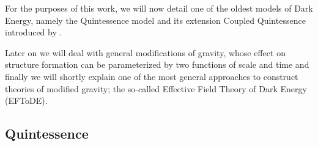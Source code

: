 For the purposes of this work, we will now detail one of the oldest models of Dark Energy, namely
the Quintessence model \cite{Ratra-Peebles; Christof} and its extension
Coupled Quintessence introduced by \cite{Amendola_2000}.

Later on we will deal with general modifications of gravity, whose
effect on structure formation can be parameterized by two functions of
scale and time and finally we will shortly explain one of the most general approaches
to construct theories of modified gravity; the so-called Effective Field Theory of Dark Energy (EFToDE).

\subsection{Quintessence \label{sub:quintessence}}

